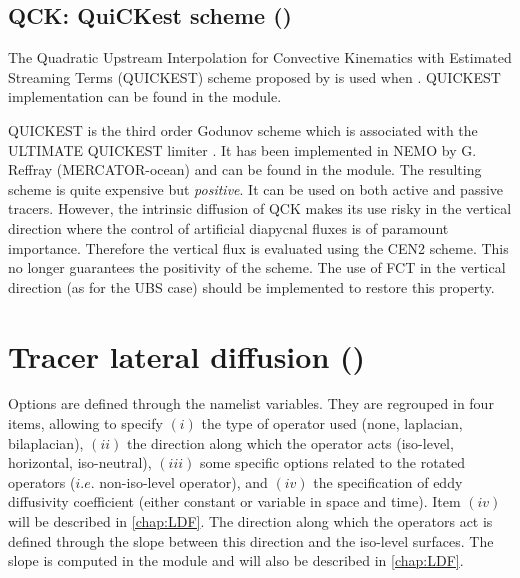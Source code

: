 \documentclass[../main/NEMO_manual]{subfiles}
\begin{document}
\subsection{QCK: QuiCKest scheme (\protect{})}
\label{subsec:TRA_adv_qck}

The Quadratic Upstream Interpolation for Convective Kinematics with Estimated Streaming Terms (QUICKEST) scheme
proposed by \citet{Leonard1979} is used when .
QUICKEST implementation can be found in the  module.

QUICKEST is the third order Godunov scheme which is associated with the ULTIMATE QUICKEST limiter
\citep{Leonard1991}.
It has been implemented in NEMO by G. Reffray (MERCATOR-ocean) and can be found in the  module.
The resulting scheme is quite expensive but \emph{positive}.
It can be used on both active and passive tracers.
However, the intrinsic diffusion of QCK makes its use risky in the vertical direction where
the control of artificial diapycnal fluxes is of paramount importance.
Therefore the vertical flux is evaluated using the CEN2 scheme.
This no longer guarantees the positivity of the scheme.
The use of FCT in the vertical direction (as for the UBS case) should be implemented to restore this property.



\section{Tracer lateral diffusion (\protect{})}
\label{sec:TRA_ldf}

 
Options are defined through the  namelist variables.
They are regrouped in four items, allowing to specify 
$(i)$   the type of operator used (none, laplacian, bilaplacian),
$(ii)$  the direction along which the operator acts (iso-level, horizontal, iso-neutral),
$(iii)$ some specific options related to the rotated operators ($i.e.$ non-iso-level operator), and
$(iv)$  the specification of eddy diffusivity coefficient (either constant or variable in space and time).
Item $(iv)$ will be described in \autoref{chap:LDF}.
The direction along which the operators act is defined through the slope between
this direction and the iso-level surfaces.
The slope is computed in the  module and will also be described in \autoref{chap:LDF}.
\end{document}
